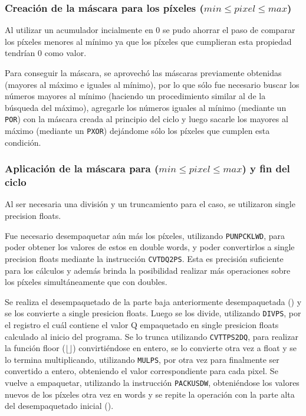 \subsubsection{Creación de la máscara para los píxeles ($min \leq pixel \leq max$)}
Al utilizar un acumulador incialmente en 0 se pudo ahorrar el paso de comparar los píxeles menores al mínimo ya que los píxeles que cumplieran esta propiedad tendrían 0 como valor.

Para conseguir la máscara, se aprovechó las máscaras previamente obtenidas (mayores al máximo e iguales al mínimo), por lo que sólo fue necesario buscar los números mayores al mínimo (haciendo un procedimiento similar al de la búsqueda del máximo), agregarle los números iguales al mínimo (mediante un \texttt{POR}) con la máscara creada al principio del ciclo y luego sacarle los mayores al máximo (mediante un \texttt{PXOR}) dejándome sólo los píxeles que cumplen esta condición.

\subsubsection{Aplicación de la máscara para ($min \leq pixel \leq max$) y fin del ciclo}
Al ser necesaria una división y un truncamiento para el caso, se utilizaron single precision floats.

Fue necesario desempaquetar aún más los píxeles, utilizando \texttt{PUNPCKLWD}, para poder obtener los valores de estos en double words, y poder convertirlos a single precision floats mediante la instrucción \texttt{CVTDQ2PS}. Esta es precisión suficiente para los cálculos y además brinda la posibilidad realizar más operaciones sobre los píxeles simultáneamente que con doubles.

Se realiza el desempaquetado de la parte baja anteriormente desempaquetada () y se los convierte a single presicion floats. Luego se los divide, utilizando \texttt{DIVPS}, por el registro  el cuál contiene el valor Q empaquetado en single presicion floats calculado al inicio del programa. Se lo trunca utilizando \texttt{CVTTPS2DQ}, para realizar la función floor ($\lfloor \rfloor$) convirtiéndose en entero, se lo convierte otra vez a float y se lo termina multiplicando, utilizando \texttt{MULPS}, por  otra vez para finalmente ser convertido a entero, obteniendo el valor correspondiente para cada pixel. Se vuelve a empaquetar, utilizando la instrucción \texttt{PACKUSDW}, obteniéndose los valores nuevos de los píxeles otra vez en words y se repite la operación con la parte alta del desempaquetado inicial ().

